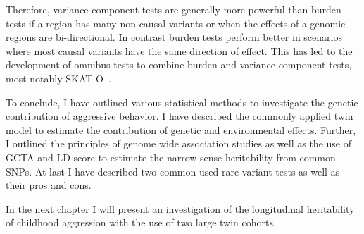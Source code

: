 \documentclass[../header.tex]{subfiles}
\begin{document}
Therefore, variance-component tests are generally more powerful than burden tests if a region has many non-causal variants or when the effects of a genomic regions are bi-directional.
In contrast burden tests perform better in scenarios where most causal variants have the same direction of effect.
This has led to the development of omnibus tests to combine burden and variance component tests, most notably SKAT-O~\cite{Lee2012}.
\bigskip

To conclude, I have outlined various statistical methods to investigate the genetic contribution of aggressive behavior.
I have described the commonly applied twin model to estimate the contribution of genetic and environmental effects.
Further, I outlined the principles of genome wide association studies as well as the use of GCTA and LD-score to estimate the narrow sense heritability from common SNPs.
At last I have described two common used rare variant tests as well as their pros and cons.

In the next chapter I will present an investigation of the longitudinal heritability of childhood aggression with the use of two large twin cohorts. 
\end{document}
